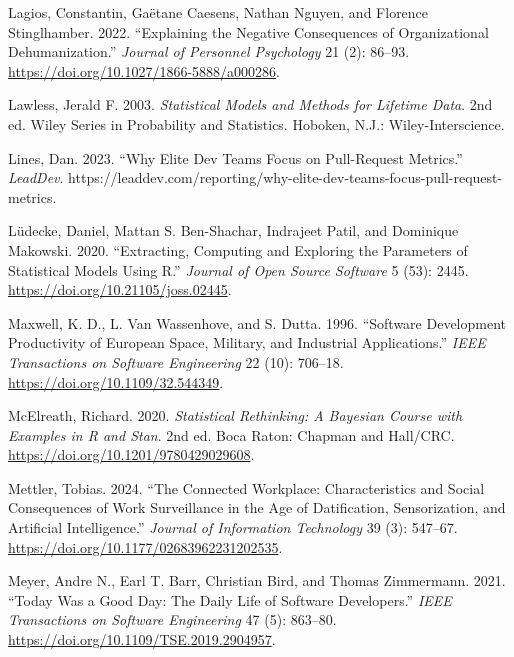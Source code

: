 \documentclass[
]{article}
\newlength{\cslhangindent}
\newenvironment{CSLReferences}[2] %
 {\begin{list}{}{%
  \setlength{\itemindent}{0pt}
  \setlength{\leftmargin}{0pt}
  \setlength{\parsep}{0pt}
  \ifodd #1
   \setlength{\leftmargin}{\cslhangindent}
   \setlength{\itemindent}{-1\cslhangindent}
  \fi
  \setlength{\itemsep}{#2\baselineskip}}}
 {\end{list}}
\begin{document}
\begin{CSLReferences}{1}{0}
Lagios, Constantin, Gaëtane Caesens, Nathan Nguyen, and Florence
Stinglhamber. 2022. {``Explaining the {Negative Consequences} of
{Organizational} {Dehumanization}.''} \emph{Journal of Personnel
Psychology} 21 (2): 86--93.
\url{https://doi.org/10.1027/1866-5888/a000286}.

Lawless, Jerald F. 2003. \emph{Statistical Models and Methods for
Lifetime Data}. 2nd ed. Wiley Series in Probability and Statistics.
Hoboken, N.J.: Wiley-Interscience.

Lines, Dan. 2023. {``Why Elite Dev Teams Focus on Pull-Request
Metrics.''} \emph{LeadDev}.
https://leaddev.com/reporting/why-elite-dev-teams-focus-pull-request-metrics.

Lüdecke, Daniel, Mattan S. Ben-Shachar, Indrajeet Patil, and Dominique
Makowski. 2020. {``Extracting, Computing and Exploring the Parameters of
Statistical Models Using {R}.''} \emph{Journal of Open Source Software}
5 (53): 2445. \url{https://doi.org/10.21105/joss.02445}.

Maxwell, K. D., L. Van Wassenhove, and S. Dutta. 1996. {``Software
Development Productivity of {European} Space, Military, and Industrial
Applications.''} \emph{IEEE Transactions on Software Engineering} 22
(10): 706--18. \url{https://doi.org/10.1109/32.544349}.

McElreath, Richard. 2020. \emph{Statistical {Rethinking}: {A Bayesian
Course} with {Examples} in {R} and {Stan}}. 2nd ed. Boca Raton: {Chapman
and Hall/CRC}. \url{https://doi.org/10.1201/9780429029608}.

Mettler, Tobias. 2024. {``The Connected Workplace: {Characteristics} and
Social Consequences of Work Surveillance in the Age of Datification,
Sensorization, and Artificial Intelligence.''} \emph{Journal of
Information Technology} 39 (3): 547--67.
\url{https://doi.org/10.1177/02683962231202535}.

Meyer, Andre N., Earl T. Barr, Christian Bird, and Thomas Zimmermann.
2021. {``Today {Was} a {Good Day}: {The Daily Life} of {Software
Developers}.''} \emph{IEEE Transactions on Software Engineering} 47 (5):
863--80. \url{https://doi.org/10.1109/TSE.2019.2904957}.


\end{CSLReferences}
\end{document}
